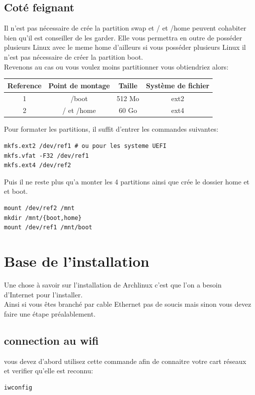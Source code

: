 \documentclass[a4paper]{book}
\begin{document}
\section{Coté feignant}
Il n'est pas nécessaire de crée la partition swap et / et /home peuvent
cohabiter bien qu'il est conseiller de les garder. Elle vous permettra en outre
de posséder plusieurs Linux avec le meme home d'ailleurs si vous posséder
plusieurs Linux il n'est pas nécessaire de créer la partition boot.\\
Revenons au cas ou vous voulez moins partitionner vous obtiendriez alors\@:\\
\begin{tabular*}{\textwidth}{|c|c|c|c}
  Reference & Point de montage & Taille & Système de fichier\\
  \hline
  1 & /boot & 512 Mo & ext2 \\
  \hline
  2 & / et /home & 60 Go & ext4\\
\end{tabular*}
\newline
Pour formater les partitions, il suffit d'entrer les commandes suivantes:\\
\begin{lstlisting}
mkfs.ext2 /dev/ref1 # ou pour les systeme UEFI
mkfs.vfat -F32 /dev/ref1 
mkfs.ext4 /dev/ref2
\end{lstlisting}
Puis il ne reste plus qu'a monter les 4 partitions ainsi que crée le dossier
home et et boot.\\
\begin{lstlisting}
mount /dev/ref2 /mnt
mkdir /mnt/{boot,home}
mount /dev/ref1 /mnt/boot
\end{lstlisting}

\chapter{Base de l'installation}
Une chose à savoir sur l'installation de Archlinux c'est que l'on a besoin
d'Internet pour l'installer.\\
Ainsi si vous êtes branch\'e par cable Ethernet pas de soucis mais sinon vous
devez faire une \'etape préalablement.
\section{connection au wifi}
vous devez d'abord utilisez cette commande afin de connaitre votre cart
réseaux et verifier qu'elle est reconnu:\\
\begin{lstlisting}
iwconfig
\end{lstlisting}
\end{document}
